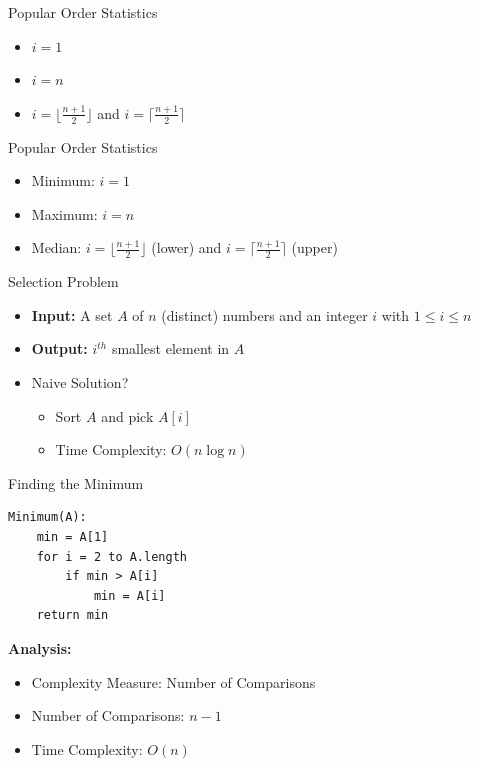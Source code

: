 \documentclass{beamer}
\begin{document}
\begin{frame}{Popular Order Statistics}
\begin{itemize}
\item $i=1$  
\item $i=n$
\item $i=\lfloor \frac{n+1}{2} \rfloor$ and $i=\lceil \frac{n+1}{2}\rceil$
\end{itemize}
\end{frame}


\begin{frame}{Popular Order Statistics}
\begin{itemize}
\item Minimum: $i=1$  
\item Maximum: $i=n$
\item Median: $i=\lfloor \frac{n+1}{2} \rfloor$ (lower) and $i=\lceil \frac{n+1}{2}\rceil$ (upper)
\end{itemize}
\end{frame}


\begin{frame}{Selection Problem}
\begin{itemize}
\item {\bf Input:} A set $A$ of $n$ (distinct) numbers and an integer $i$ with $1 \leq i \leq n$
\item {\bf Output:} $i^{th}$ smallest element in $A$ 
\item Naive Solution?
\pause
\begin{itemize}
    \item Sort $A$ and pick $A[i]$
    \item Time Complexity: $O(n \log n)$
\end{itemize}
\end{itemize}
\end{frame}




\begin{frame}[fragile]{Finding the Minimum}
\pause
\begin{verbatim}
Minimum(A):
    min = A[1]
    for i = 2 to A.length
        if min > A[i]
            min = A[i]
    return min        
\end{verbatim}
{\bf Analysis:}
\pause 
\begin{itemize}
\item Complexity Measure: Number of Comparisons
\pause
\item Number of Comparisons: $n-1$
\item Time Complexity: $O(n)$
\end{itemize}
\end{frame}
\end{document}
